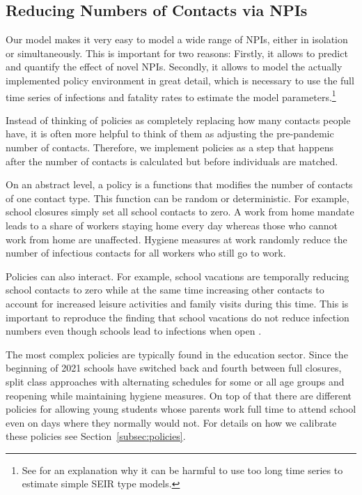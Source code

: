 \subsection{Reducing Numbers of Contacts via NPIs}
\label{sec:policies}



Our model makes it very easy to model a wide range of NPIs, either in isolation or
simultaneously. This is important for two reasons: Firstly, it allows to predict and
quantify the effect of novel NPIs. Secondly, it allows to model the actually implemented
policy environment in great detail, which is necessary to use the full time series
of infections and fatality rates to estimate the model parameters.\footnote{
See \citet{Avery2020} for an explanation why it can be harmful to use too long time
series to estimate simple SEIR type models.}


Instead of thinking of policies as completely replacing how many contacts people have,
it is often more helpful to think of them as adjusting the pre-pandemic number of
contacts. Therefore, we implement policies as a step that happens after the number of contacts is
calculated but before individuals are matched.

On an abstract level, a policy is a functions that modifies the number of contacts of
one contact type. This function can be random or deterministic. For example, school
closures simply set all school contacts to zero. A work from home mandate leads to a
share of workers staying home every day whereas those who cannot work from home are
unaffected. Hygiene measures at work randomly reduce the number of infectious contacts
for all workers who still go to work.

Policies can also interact. For example, school vacations are temporally reducing school
contacts to zero while at the same time increasing other contacts to account for
increased leisure activities and family visits during this time. This is important to
reproduce the finding that school vacations do not reduce infection numbers even though
schools lead to infections when open \citep{Isphording2021}.

The most complex policies are typically found in the education sector. Since the
beginning of 2021 schools have switched back and fourth between full closures, split
class approaches with alternating schedules for some or all age groups and reopening
while maintaining hygiene measures. On top of that there are different policies for
allowing young students whose parents work full time to attend school even on days where
they normally would not. For details on how we calibrate these policies see
Section~\ref{subsec:policies}.

